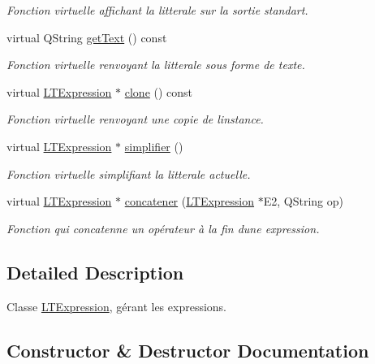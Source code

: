 \begin{DoxyCompactItemize}
\begin{DoxyCompactList}\small\item\em Fonction virtuelle affichant la litterale sur la sortie standart. \end{DoxyCompactList}\item 
virtual Q\+String \hyperlink{class_l_t_expression_a13d5a9d4a536ed34effcb08a6e5391a6}{get\+Text} () const 
\begin{DoxyCompactList}\small\item\em Fonction virtuelle renvoyant la litterale sous forme de texte. \end{DoxyCompactList}\item 
virtual \hyperlink{class_l_t_expression}{L\+T\+Expression} $\ast$ \hyperlink{class_l_t_expression_ab51c526b6232a131bea9a43945633b2a}{clone} () const 
\begin{DoxyCompactList}\small\item\em Fonction virtuelle renvoyant une copie de l\textquotesingle{}instance. \end{DoxyCompactList}\item 
virtual \hyperlink{class_l_t_expression}{L\+T\+Expression} $\ast$ \hyperlink{class_l_t_expression_a8817e6f26189ad7a4e65bd24f6020367}{simplifier} ()
\begin{DoxyCompactList}\small\item\em Fonction virtuelle simplifiant la litterale actuelle. \end{DoxyCompactList}\item 
virtual \hyperlink{class_l_t_expression}{L\+T\+Expression} $\ast$ \hyperlink{class_l_t_expression_a10eaec4e530a4e763daa16f919d40d8a}{concatener} (\hyperlink{class_l_t_expression}{L\+T\+Expression} $\ast$E2, Q\+String op)
\begin{DoxyCompactList}\small\item\em Fonction qui concatenne un opérateur à la fin d\textquotesingle{}une expression. \end{DoxyCompactList}\end{DoxyCompactItemize}


\subsection{Detailed Description}
Classe \hyperlink{class_l_t_expression}{L\+T\+Expression}, gérant les expressions. 

\subsection{Constructor \& Destructor Documentation}
